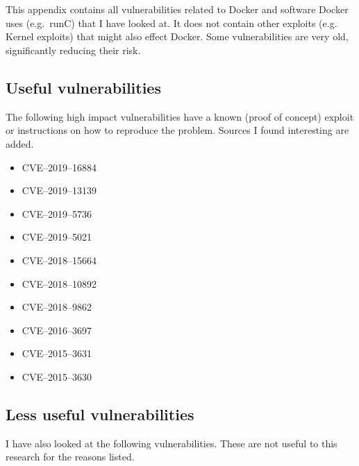 \chapter{}\label{appendix:CVE-List}

This appendix contains all vulnerabilities related to Docker and software Docker uses (e.g.\ runC) that I have looked at. It does not contain other exploits (e.g. Kernel exploits) that might also effect Docker. Some vulnerabilities are very old, significantly reducing their risk.

\section{Useful vulnerabilities}
The following high impact vulnerabilities have a known (proof of concept) exploit or instructions on how to reproduce the problem. Sources I found interesting are added.
\begin{itemize}
    \item CVE--2019--16884\cite{CVE-2019-16884-Github}
    \item CVE--2019--13139\cite{CVE-2019-13139-STAALDRAAD}
    \item CVE--2019--5736\cite{CVE-2019-5736-DragonSector}\cite{CVE-2019-5736-Github}\cite{CVE-2019-5736-Twistlock}
    \item CVE--2019--5021\cite{CVE-2019-5021-Talos}\cite{CVE-2019-5021-Alpine}
    \item CVE--2018--15664\cite{CVE-2018-15664-Openwall}\cite{CVE-2018-15664-Bugzilla}
    \item CVE--2018--10892\cite{CVE-2018-10892-Github}
    \item CVE--2018--9862\cite{CVE-2018-9862-Github}
    \item CVE--2016--3697\cite{CVE-2016-3697-Github}
    \item CVE--2015--3631\cite{CVE-2015-363-Seclists}
    \item CVE--2015--3630\cite{CVE-2015-363-Seclists}
\end{itemize}

\section{Less useful vulnerabilities}
I have also looked at the following vulnerabilities. These are not useful to this research for the reasons listed.

\hfill


